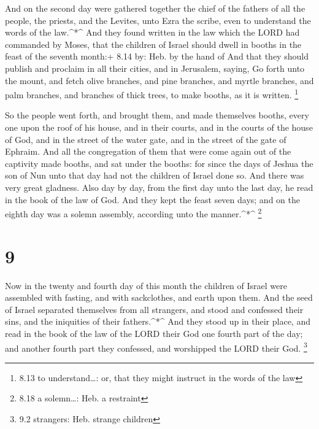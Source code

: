  And on the second day were gathered together the chief of
the fathers of all the people, the priests, and the Levites, unto Ezra
the scribe, even to understand the words of the law.\^{}*\^{}
 And they found written in the law which the LORD had
commanded by Moses, that the children of Israel should dwell in booths
in the feast of the seventh month:+ 8.14 by: Heb. by the hand of
 And that they should publish and proclaim in all their
cities, and in Jerusalem, saying, Go forth unto the mount, and fetch
olive branches, and pine branches, and myrtle branches, and palm
branches, and branches of thick trees, to make booths, as it is written.
\footnote{8.13 to understand\ldots: or, that they might instruct in the
  words of the law}

 So the people went forth, and brought them, and made
themselves booths, every one upon the roof of his house, and in their
courts, and in the courts of the house of God, and in the street of the
water gate, and in the street of the gate of Ephraim.  And
all the congregation of them that were come again out of the captivity
made booths, and sat under the booths: for since the days of Jeshua the
son of Nun unto that day had not the children of Israel done so. And
there was very great gladness.  Also day by day, from the
first day unto the last day, he read in the book of the law of God. And
they kept the feast seven days; and on the eighth day was a solemn
assembly, according unto the manner.\^{}*\^{} \footnote{8.18 a
  solemn\ldots: Heb. a restraint}

\hypertarget{section-8}{%
\section{9}\label{section-8}}

 Now in the twenty and fourth day of this month the children
of Israel were assembled with fasting, and with sackclothes, and earth
upon them.  And the seed of Israel separated themselves from
all strangers, and stood and confessed their sins, and the iniquities of
their fathers.\^{}*\^{}  And they stood up in their place,
and read in the book of the law of the LORD their God one fourth part of
the day; and another fourth part they confessed, and worshipped the LORD
their God. \footnote{9.2 strangers: Heb. strange children}

